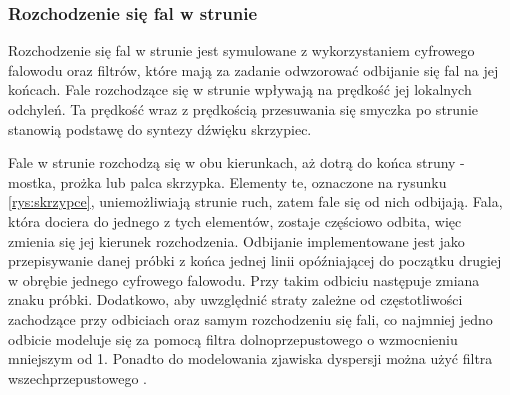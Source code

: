 \subsubsection{Rozchodzenie się fal w strunie}
Rozchodzenie się fal w strunie jest symulowane z wykorzystaniem cyfrowego falowodu oraz filtrów, które mają za zadanie odwzorować odbijanie się fal na jej końcach. Fale rozchodzące się w strunie wpływają na prędkość jej lokalnych odchyleń. Ta prędkość wraz z prędkością przesuwania się smyczka po strunie stanowią podstawę do syntezy dźwięku skrzypiec. 


Fale w strunie rozchodzą się w obu kierunkach, aż dotrą do końca struny - mostka, prożka lub palca skrzypka. Elementy te, oznaczone na rysunku \ref{rys:skrzypce}, uniemożliwiają strunie ruch, zatem fale się od nich odbijają. Fala, która dociera do jednego z tych elementów, zostaje częściowo odbita, więc zmienia się jej kierunek rozchodzenia. Odbijanie implementowane jest jako przepisywanie danej próbki z końca jednej linii opóźniającej do początku drugiej w obrębie jednego cyfrowego falowodu. Przy takim odbiciu następuje zmiana znaku próbki.
Dodatkowo, aby uwzględnić straty zależne od częstotliwości zachodzące przy odbiciach oraz samym rozchodzeniu się fali, co najmniej jedno odbicie modeluje się za pomocą filtra dolnoprzepustowego o wzmocnieniu mniejszym od 1. 
Ponadto do modelowania zjawiska dyspersji można użyć filtra wszechprzepustowego \cite{allpass}.


